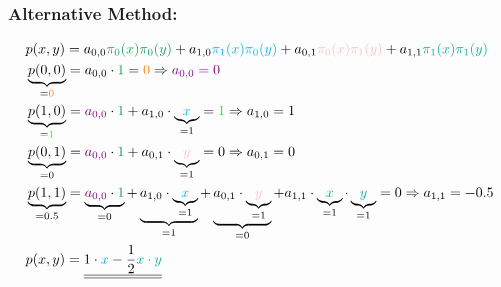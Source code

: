 \subsubsection{Alternative Method:}
$$
\begin{aligned}
& p(x, y)=a_{0,0} \textcolor{ForestGreen}{\pi_0(x) \pi_0(y)}+a_{1,0} \textcolor{Cyan}{\pi_1(x) \pi_0(y)}+a_{0,1} \textcolor{pink}{\pi_0(x) \pi_1(y)}+a_{1,1} \textcolor{JungleGreen}{\pi_1(x) \pi_1(y)} \\
& \underbrace{p(0, 0)}_{=\textcolor{orange}{0}}=a_{0,0} \cdot \textcolor{ForestGreen}{1} =\textcolor{orange}{0}\Rightarrow \textcolor{violet}{a_{0,0}=0}\\
& \underbrace{p(1, 0)}_{=\textcolor{green}{1}}=\textcolor{violet}{a_{0,0}} \cdot \textcolor{ForestGreen}{1} + a_{1,0} \cdot \underbrace{\textcolor{Cyan}{x}}_{=1} =\textcolor{green}{1}\Rightarrow a_{1,0}=1\\
& \underbrace{p(0, 1)}_{=0}=\textcolor{violet}{a_{0,0}} \cdot \textcolor{ForestGreen}{1} + a_{0,1} \cdot \underbrace{\textcolor{pink}{y}}_{=1} =0\Rightarrow a_{0,1}=0\\
& \underbrace{p(1, 1)}_{=0.5}=\underbrace{\textcolor{violet}{a_{0,0}} \cdot \textcolor{ForestGreen}{1}}_{=0} + \underbrace{a_{1,0} \cdot \underbrace{\textcolor{Cyan}{x}}_{=1}}_{=1} + \underbrace{a_{0,1} \cdot \underbrace{\textcolor{pink}{y}}_{=1}}_{=0} + a_{1,1} \cdot \underbrace{\textcolor{JungleGreen}{x}}_{=1} \cdot \underbrace{\textcolor{JungleGreen}{y}}_{=1} =0\Rightarrow a_{1,1}=-0.5\\
&p(x, y)=\underline{\underline{1\cdot \textcolor{Cyan}{x} - \frac{1}{2} \textcolor{JungleGreen}{x \cdot y}}}
\end{aligned}
$$

